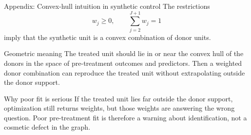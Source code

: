 \documentclass[10pt]{beamer}
\begin{document}
\begin{frame}{Appendix: Convex-hull intuition in synthetic control}
\label{app:sc-geom}
\small
The restrictions
\[
w_j\ge 0,
\qquad
\sum_{j=2}^{J+1} w_j = 1
\]
imply that the synthetic unit is a convex combination of donor units.

\begin{block}{Geometric meaning}
The treated unit should lie in or near the convex hull of the donors in the space of pre-treatment outcomes and predictors. Then a weighted donor combination can reproduce the treated unit without extrapolating outside the donor support.
\end{block}

\begin{alertblock}{Why poor fit is serious}
If the treated unit lies far outside the donor support, optimization still returns weights, but those weights are answering the wrong question. Poor pre-treatment fit is therefore a warning about identification, not a cosmetic defect in the graph.
\end{alertblock}
\hfill\hyperlink{slide:sc_objective}{}
\end{frame}
\end{document}
